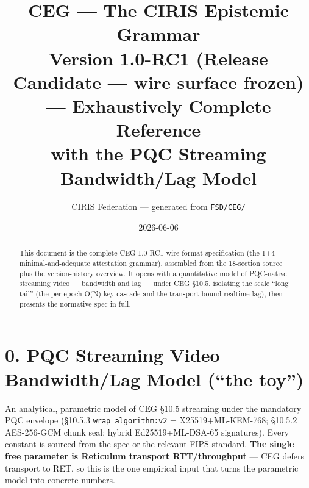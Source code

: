\documentclass[10pt]{article}
\title{\textbf{CEG --- The CIRIS Epistemic Grammar}\\[4pt]\large Version 1.0-RC1 (Release Candidate --- wire surface frozen) --- Exhaustively Complete Reference\\[2pt]\normalsize with the PQC Streaming Bandwidth/Lag Model}
\author{CIRIS Federation --- generated from \texttt{FSD/CEG/}}
\date{2026-06-06}
\begin{document}
\maketitle
\begin{abstract}\noindent
This document is the complete CEG 1.0-RC1 wire-format specification (the 1+4
minimal-and-adequate attestation grammar), assembled from the 18-section source
plus the version-history overview. It opens with a quantitative model of
PQC-native streaming video --- bandwidth and lag --- under CEG \S10.5, isolating
the scale ``long tail'' (the per-epoch O(N) key cascade and the transport-bound
realtime lag), then presents the normative spec in full.
\end{abstract}
\tableofcontents
\clearpage


\section*{0. PQC Streaming Video --- Bandwidth/Lag Model (``the toy'')}

An analytical, parametric model of CEG \S10.5 streaming under the mandatory PQC
envelope (\S10.5.3 \texttt{wrap\_algorithm:v2} = X25519+ML-KEM-768; \S10.5.2
AES-256-GCM chunk seal; hybrid Ed25519+ML-DSA-65 signatures). Every constant is
sourced from the spec or the relevant FIPS standard. \textbf{The single free
parameter is Reticulum transport RTT/throughput} --- CEG defers transport to RET,
so this is the one empirical input that turns the parametric model into concrete
numbers.
\end{document}

